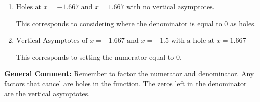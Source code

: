 \documentclass{extbook}[14pt]
\begin{document}
\begin{enumerate}
{\begin{enumerate}[label=\Alph*.]
This is the correct answer.
\item \( \text{Holes at } x = -1.667 \text{ and } x = 1.667 \text{ with no vertical asymptotes.} \)

This corresponds to considering where the denominator is equal to 0 as holes.
\item \( \text{Vertical Asymptotes of } x = -1.667 \text{ and } x = -1.5 \text{ with a hole at } x = 1.667 \)

This corresponds to setting the numerator equal to 0.
\end{enumerate}

\textbf{General Comment:} Remember to factor the numerator and denominator. Any factors that cancel are holes in the function. The zeros left in the denominator are the vertical asymptotes.
}
\end{enumerate}
\end{document}

